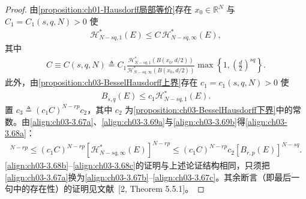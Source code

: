 \documentclass[../../main.tex]{subfiles}%
\begin{document}
\begin{proof}
由\cref{proposition:ch01-Hausdorff局部等价}存在 $x_0\in\mathbb{R}^N$ 与 $C_1=C_1(s,q,N)>0$ 使
\begin{align}
\mathcal{H}^*_{N-sq,1}(E)\leqslant C\,\mathcal{H}^*_{N-sq,\infty}(E),\label{align:ch03-3.69a}
\end{align}
其中
\begin{align*}
C\equiv C(s,q,N)\triangleq C_1\frac{\mathcal{H}^*_{N-sq,1}(B(x_0,d/2))}{\mathcal{H}^*_{N-sq,\infty}(B(x_0,d/2))}
\max\left\{1,\left(\frac d2\right)^{sq}\right\}.
\end{align*}
此外，由\cref{proposition:ch03-BesselHausdorff上界}存在 $c_1=c_1(s,q,N)>0$ 使
\begin{align}
B_{s,q}(E)\leqslant c_1\mathcal{H}^*_{N-sq,1}(E).\label{align:ch03-3.69b}
\end{align}
置 $c_3\triangleq(c_1C)^{N-rp}c_2$，其中 $c_2$ 为\cref{proposition:ch03-BesselHausdorff下界}中的常数。由\eqref{align:ch03-3.67a}、\eqref{align:ch03-3.69a}与\eqref{align:ch03-3.69b}得\eqref{align:ch03-3.68a}：
\begin{align*}
[B_{s,q}(E)]^{N-rp}\leqslant(c_1C)^{N-rp}[\mathcal{H}^*_{N-sq,\infty}(E)]^{N-rp}
\leqslant(c_1C)^{N-rp}c_2[B_{r,p}(E)]^{N-sq}.
\end{align*}
\eqref{align:ch03-3.68b}--\eqref{align:ch03-3.68c}的证明与上述论证结构相同，只须把\eqref{align:ch03-3.67a}换为\eqref{align:ch03-3.67b}--\eqref{align:ch03-3.67c}。其余断言（即最后一句中的存在性）的证明见文献~[2, Theorem 5.5.1]。
\end{proof}
\end{document}
